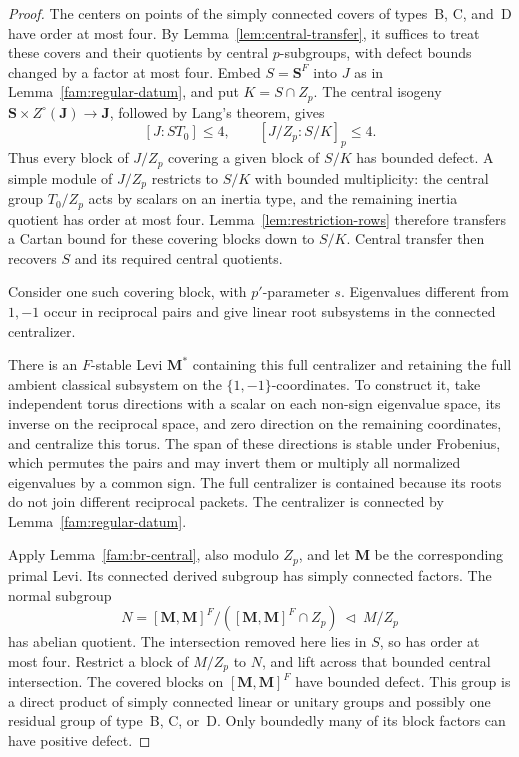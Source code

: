 \begin{proof}
The centers on points of the simply connected covers of types~B, C, and~D have
order at most four.  By Lemma~\ref{lem:central-transfer}, it
suffices to treat these covers and their quotients by central
\(p\)-subgroups, with defect bounds changed by a factor at most four.
Embed \(S=\mathbf S^F\) into \(J\) as in
Lemma~\ref{fam:regular-datum}, and put \(K=S\cap Z_p\).
The central isogeny
\(\mathbf S\times Z^\circ(\mathbf J)\to\mathbf J\), followed
by Lang's theorem, gives
\[
 [J:S T_0]\leq4,\qquad
 [J/Z_p:S/K]_p\leq4.
\]
Thus every block of \(J/Z_p\) covering a given block of \(S/K\)
has bounded defect.  A simple module of \(J/Z_p\) restricts to
\(S/K\) with bounded multiplicity: the central group \(T_0/Z_p\)
acts by scalars on an inertia type, and the remaining inertia
quotient has order at most four.  Lemma~\ref{lem:restriction-rows}
therefore transfers a Cartan bound for these covering blocks
down to \(S/K\).  Central transfer then recovers \(S\) and its
required central quotients.

Consider one such covering block, with \(p'\)-parameter \(s\).
Eigenvalues different from \(1,-1\) occur in
reciprocal pairs and give linear root subsystems in the connected
centralizer.

There is an \(F\)-stable Levi \(\mathbf M^*\) containing this full
centralizer and retaining the full ambient classical subsystem on
the \(\{1,-1\}\)-coordinates.  To construct it, take independent
torus directions with a scalar on each non-sign eigenvalue space,
its inverse on the reciprocal space, and zero direction on the
remaining coordinates, and centralize this torus.  The span of
these directions is stable under Frobenius, which permutes the
pairs and may invert them or multiply all normalized eigenvalues
by a common sign.  The full centralizer is contained because its
roots do not join different reciprocal packets.  The centralizer
is connected by Lemma~\ref{fam:regular-datum}.

Apply Lemma~\ref{fam:br-central}, also modulo \(Z_p\), and let
\(\mathbf M\) be the corresponding primal Levi.  Its connected
derived subgroup has simply connected factors.  The normal subgroup
\[
 N=[\mathbf M,\mathbf M]^F/
       ([\mathbf M,\mathbf M]^F\cap Z_p)
       \ \lhd\ M/Z_p
\]
has abelian quotient.  The intersection removed here lies in
\(S\), so has order at most four.  Restrict a block of \(M/Z_p\)
to \(N\), and lift across that bounded central intersection.
The covered blocks on \([\mathbf M,\mathbf M]^F\) have bounded
defect.  This group is a direct product of simply connected
linear or unitary groups and possibly one residual group of type~B, C, or~D.
Only boundedly many of its block factors can have positive defect.


\end{proof}
